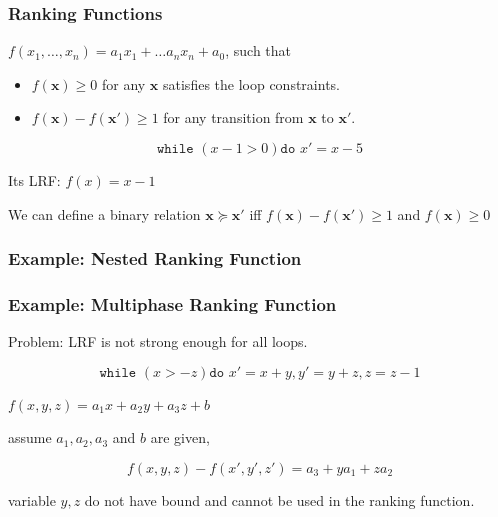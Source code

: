 \documentclass[11pt]{beamer}
\begin{document}
\begin{frame}\frametitle{Ranking Functions}

\begin{definition}

$f(x_1, \ldots, x_n) = a_1x_1 + \ldots a_nx_n + a_0$, such that

\begin{itemize}
\item $f(\textbf{x}) \ge 0$ for any $\textbf{x}$ satisfies the loop constraints.

\item $f(\textbf{x}) - f(\textbf{x}') \ge 1$ for any transition from $\textbf{x}$ to $\textbf{x}'$.



\end{itemize}
\end{definition}

\begin{example}
\[\texttt{while }( x - 1 > 0) \texttt{do } x' = x - 5\]

Its LRF: $f(x) = x - 1$
\end{example}

We can define a binary relation $\textbf{x} \succeq \textbf{x}'$ iff  $f(\textbf{x}) - f(\textbf{x}') \ge 1$ and $f(\textbf{x}) \ge 0$

\end{frame}


\begin{frame}\frametitle{Example: Nested Ranking Function}


\end{frame}

\begin{frame}\frametitle{Example: Multiphase Ranking Function}
Problem: LRF is not strong enough for all loops.
\begin{example}
\[\texttt{while }( x > -z) \texttt{do } x' = x + y, y' = y + z, z = z - 1\]

$f(x, y, z) = a_1x + a_2y + a_3z + b$

assume $a_1, a_2, a_3$ and $b$ are given, 

\[f(x, y, z) - f(x', y', z') = a_3 + ya_1 + za_2\]

variable $y, z$ do not have bound and cannot be used in the ranking function.
\end{example}

\end{frame}
\end{document}
